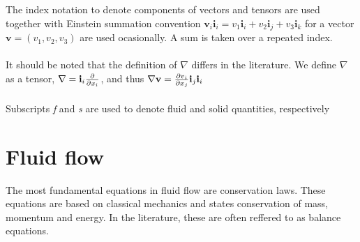 \\
\\
The index notation to denote components of vectors and tensors are used together with Einstein summation convention $\mathbf{v}_i\mathbf{i}_i = v_1\mathbf{i}_i + v_2 \mathbf{i}_j + v_3 \mathbf{i}_k$ for a vector $\mathbf{v} = (v_1,v_2,v_3)$ are used ocasionally. A sum is taken over a repeated index. 
\\
\\
It should be noted that the definition of $\nabla$ differs in the literature. We define $\nabla$ as a tensor, $\nabla = \mathbf{i}_i\frac{\partial }{\partial x_i}$, and thus $\nabla \mathbf{v} = \frac{\partial v_i}{\partial x_j}\mathbf{i}_j\mathbf{i}_i$
\\
\\
Subscripts \textit{f} and \textit{s} are used to denote fluid and solid quantities, respectively
\section{Fluid flow}
The most fundamental equations in fluid flow are conservation laws. These equations are based on classical mechanics and states conservation of mass, momentum and energy. In the literature, these are often reffered to as balance equations.
